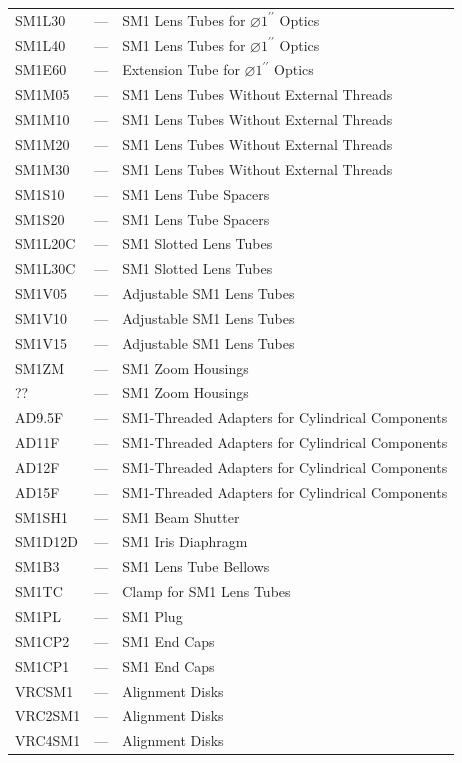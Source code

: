 \documentclass[11pt, letterpaper]{article}
\begin{document}
\begin{longtable}{@{} p{} p{} p{} @{}}
SM1L30 & --- & SM1 Lens Tubes for $\varnothing 1^{\prime\prime}$ Optics \\
SM1L40 & --- & SM1 Lens Tubes for $\varnothing 1^{\prime\prime}$ Optics \\
SM1E60 & --- & Extension Tube for $\varnothing 1^{\prime\prime}$ Optics \\
SM1M05 & --- & SM1 Lens Tubes Without External Threads \\
SM1M10 & --- & SM1 Lens Tubes Without External Threads \\
SM1M20 & --- & SM1 Lens Tubes Without External Threads \\
SM1M30 & --- & SM1 Lens Tubes Without External Threads \\
SM1S10 & --- & SM1 Lens Tube Spacers \\
SM1S20 & --- & SM1 Lens Tube Spacers \\
SM1L20C & --- & SM1 Slotted Lens Tubes \\
SM1L30C & --- & SM1 Slotted Lens Tubes \\
SM1V05 & --- & Adjustable SM1 Lens Tubes \\
SM1V10 & --- & Adjustable SM1 Lens Tubes \\
SM1V15 & --- & Adjustable SM1 Lens Tubes \\
SM1ZM & --- & SM1 Zoom Housings \\
?? & --- & SM1 Zoom Housings \\
AD9.5F & --- & SM1-Threaded Adapters for Cylindrical Components \\
AD11F & --- & SM1-Threaded Adapters for Cylindrical Components \\
AD12F & --- & SM1-Threaded Adapters for Cylindrical Components \\
AD15F & --- & SM1-Threaded Adapters for Cylindrical Components \\
SM1SH1 & --- & SM1 Beam Shutter \\
SM1D12D & --- & SM1 Iris Diaphragm \\
SM1B3 & --- & SM1 Lens Tube Bellows \\
SM1TC & --- & Clamp for SM1 Lens Tubes \\
SM1PL & --- & SM1 Plug \\
SM1CP2 & --- & SM1 End Caps \\
SM1CP1 & --- & SM1 End Caps \\
VRCSM1 & --- & Alignment Disks \\
VRC2SM1 & --- & Alignment Disks \\
VRC4SM1 & --- & Alignment Disks \\

\end{longtable}
\end{document}
